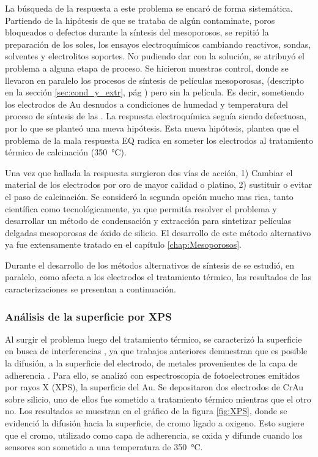 {  			La búsqueda de la respuesta a este problema se encaró de forma sistemática. Partiendo de la hipótesis de que se trataba de algún contaminate, poros bloqueados o defectos durante la síntesis del mesoporosos, se repitió la preparación de los soles, los ensayos electroquímicos cambiando reactivos, sondas, solventes y electrolitos soportes. No pudiendo dar con la solución, se atribuyó el problema a alguna etapa de proceso. Se hicieron muestras control, donde se llevaron en paralelo los procesos de síntesis de películas mesoporosas, (descripto en la sección \ref{sec:cond_y_extr}, pág \pageref{sec:cond_y_extr}) pero sin la película. Es decir, sometiendo los electrodos de Au desnudos a condiciones de humedad y temperatura del proceso de síntesis de las \pdm. La respuesta electroquímica seguía siendo defectuosa, por lo que se planteó una nueva hipótesis. Esta nueva hipótesis, plantea que el problema de la mala respuesta EQ radica en someter los electrodos al tratamiento térmico de calcinación (\SI{350}{\celsius}).

  			Una vez que hallada la respuesta surgieron dos vías de acción, 1) Cambiar el material de los electrodos por oro de mayor calidad o platino, 2) sustituir o evitar el paso de calcinación. Se consideró la segunda opción mucho mas rica, tanto científica como tecnológicamente, ya que permitía resolver el problema y desarrollar un método de condensación y extracción para sintetizar películas delgadas mesoporosas de óxido de silicio. El desarrollo de este método alternativo ya fue extensamente tratado en el capítulo \ref{chap:Mesoporosos}.

  			Durante el desarrollo de los métodos alternativos de síntesis de \pdm\space se estudió, en paralelo, como afecta a los electrodos el tratamiento térmico, las resultados de las caracterizaciones se presentan a continuación.
			
		\subsubsection{Análisis de la superficie por XPS}

			Al surgir el problema luego del tratamiento térmico, se caracterizó la superficie en busca de interferencias , ya que trabajos anteriores demuestran que es posible la difusión, a la superficie del electrodo, de metales provenientes de la capa de adherencia \cite{Alonso1990,Moody2003}. Para ello, se analizó con espectroscopia de fotoelectrones emitidos por rayos X (XPS), la superficie del Au. Se depositaron dos electrodos de Cr\textbar Au sobre silicio, uno de ellos fue sometido a tratamiento térmico mientras que el otro no. Los resultados se muestran en el gráfico de la figura \ref{fig:XPS}, donde se evidenció la difusión hacia la superficie, de cromo ligado a oxigeno. Esto sugiere que el cromo, utilizado como capa de adherencia, se oxida y difunde cuando los sensores son sometido a una temperatura de \SI{350}{\celsius}.

}
